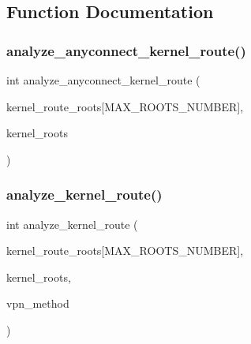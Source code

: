 \subsection{Function Documentation}
\mbox{\label{route-tree_8c_ad4fe4de0af6177aad9c1936fcaa1d988}} 
\subsubsection{\texorpdfstring{analyze\+\_\+anyconnect\+\_\+kernel\+\_\+route()}{analyze\_anyconnect\_kernel\_route()}}
{\footnotesize\ttfamily int analyze\+\_\+anyconnect\+\_\+kernel\+\_\+route (\begin{DoxyParamCaption}\item[{G\+Node $\ast$}]{kernel\+\_\+route\+\_\+roots\mbox{[}\+M\+A\+X\+\_\+\+R\+O\+O\+T\+S\+\_\+\+N\+U\+M\+B\+E\+R\mbox{]},  }\item[{int $\ast$}]{kernel\+\_\+roots }\end{DoxyParamCaption})}

\mbox{\label{route-tree_8c_a5a490e2e29be18ae630572e3776539af}} 
\subsubsection{\texorpdfstring{analyze\+\_\+kernel\+\_\+route()}{analyze\_kernel\_route()}}
{\footnotesize\ttfamily int analyze\+\_\+kernel\+\_\+route (\begin{DoxyParamCaption}\item[{G\+Node $\ast$}]{kernel\+\_\+route\+\_\+roots\mbox{[}\+M\+A\+X\+\_\+\+R\+O\+O\+T\+S\+\_\+\+N\+U\+M\+B\+E\+R\mbox{]},  }\item[{int $\ast$}]{kernel\+\_\+roots,  }\item[{enum \hyperlink{route-tree_8h_a5b876670828c4e38106ba1c6d91024b7}{V\+P\+N\+\_\+\+M\+E\+T\+H\+O\+DS}}]{vpn\+\_\+method }\end{DoxyParamCaption})}

